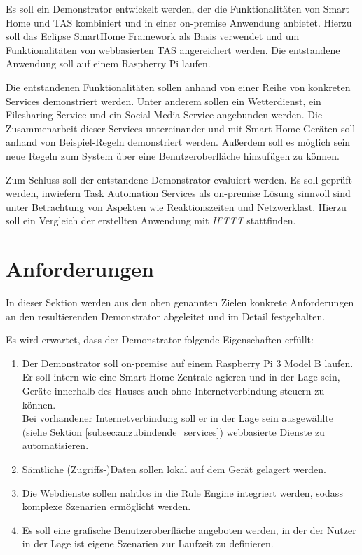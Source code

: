 Es soll ein Demonstrator entwickelt werden, der die Funktionalitäten von Smart Home und TAS kombiniert und in einer on-premise Anwendung anbietet. Hierzu soll das Eclipse SmartHome Framework als Basis verwendet und um Funktionalitäten von webbasierten TAS angereichert werden. Die entstandene Anwendung soll auf einem Raspberry Pi laufen.

Die entstandenen Funktionalitäten sollen anhand von einer Reihe von konkreten Services demonstriert werden. Unter anderem sollen ein Wetterdienst, ein Filesharing Service und ein Social Media Service angebunden werden. Die Zusammenarbeit dieser Services untereinander und mit Smart Home Geräten soll anhand von Beispiel-Regeln demonstriert werden. Außerdem soll es möglich sein neue Regeln zum System über eine Benutzeroberfläche hinzufügen zu können.

Zum Schluss soll der entstandene Demonstrator evaluiert werden. Es soll geprüft werden, inwiefern Task Automation Services als on-premise Lösung sinnvoll sind unter Betrachtung von Aspekten wie Reaktionszeiten und Netzwerklast. Hierzu soll ein Vergleich der erstellten Anwendung mit \textit{IFTTT} stattfinden.

\section{Anforderungen}
\label{sec:anforderungen}
In dieser Sektion werden aus den oben genannten Zielen konkrete Anforderungen an den resultierenden Demonstrator abgeleitet und im Detail festgehalten.

Es wird erwartet, dass der Demonstrator folgende Eigenschaften erfüllt:
\begin{enumerate}
\item Der Demonstrator soll on-premise auf einem Raspberry Pi 3 Model B laufen. Er soll intern wie eine Smart Home Zentrale agieren und in der Lage sein, Geräte innerhalb des Hauses auch ohne Internetverbindung steuern zu können. \\
Bei vorhandener Internetverbindung soll er in der Lage sein ausgewählte (siehe Sektion \ref{subsec:anzubindende_services}) webbasierte Dienste zu automatisieren.
\item Sämtliche (Zugriffs-)Daten sollen lokal auf dem Gerät gelagert werden. 
\item Die Webdienste sollen nahtlos in die Rule Engine integriert werden, sodass komplexe Szenarien ermöglicht werden.
\item Es soll eine grafische Benutzeroberfläche angeboten werden, in der der Nutzer in der Lage ist eigene Szenarien zur Laufzeit zu definieren.

\end{enumerate}


